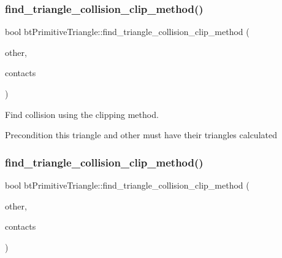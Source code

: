 \subsubsection{\texorpdfstring{find\+\_\+triangle\+\_\+collision\+\_\+clip\+\_\+method()}{find\_triangle\_collision\_clip\_method()}\hspace{0.1cm}{\footnotesize\ttfamily [1/2]}}
{\footnotesize\ttfamily bool bt\+Primitive\+Triangle\+::find\+\_\+triangle\+\_\+collision\+\_\+clip\+\_\+method (\begin{DoxyParamCaption}\item[{\hyperlink{classbtPrimitiveTriangle}{bt\+Primitive\+Triangle} \&}]{other,  }\item[{\hyperlink{structGIM__TRIANGLE__CONTACT}{G\+I\+M\+\_\+\+T\+R\+I\+A\+N\+G\+L\+E\+\_\+\+C\+O\+N\+T\+A\+CT} \&}]{contacts }\end{DoxyParamCaption})}



Find collision using the clipping method. 

\begin{DoxyPrecond}{Precondition}
this triangle and other must have their triangles calculated 
\end{DoxyPrecond}
\mbox{\label{classbtPrimitiveTriangle_a24c4903aecd95c2d11bbc42ba3df0e66}} 
\subsubsection{\texorpdfstring{find\+\_\+triangle\+\_\+collision\+\_\+clip\+\_\+method()}{find\_triangle\_collision\_clip\_method()}\hspace{0.1cm}{\footnotesize\ttfamily [2/2]}}
{\footnotesize\ttfamily bool bt\+Primitive\+Triangle\+::find\+\_\+triangle\+\_\+collision\+\_\+clip\+\_\+method (\begin{DoxyParamCaption}\item[{\hyperlink{classbtPrimitiveTriangle}{bt\+Primitive\+Triangle} \&}]{other,  }\item[{\hyperlink{structGIM__TRIANGLE__CONTACT}{G\+I\+M\+\_\+\+T\+R\+I\+A\+N\+G\+L\+E\+\_\+\+C\+O\+N\+T\+A\+CT} \&}]{contacts }\end{DoxyParamCaption})}



